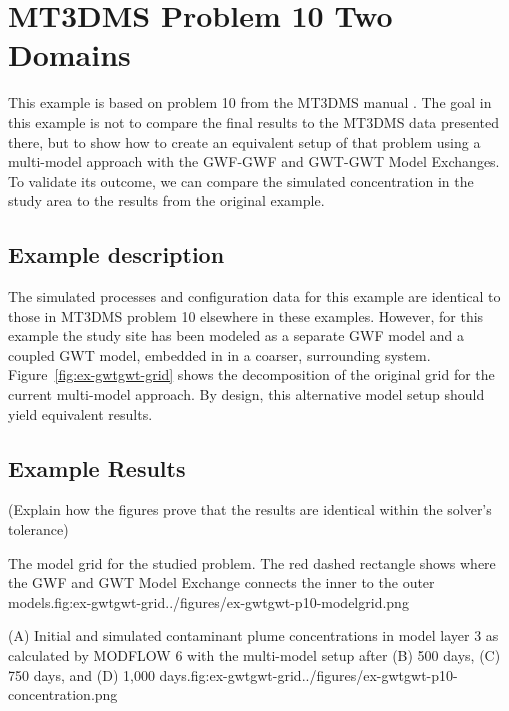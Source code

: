 \section{MT3DMS Problem 10 Two Domains}

This example is based on problem 10 from the MT3DMS manual \citep{zheng1999mt3dms}. The goal in this example is not to compare the final results to the MT3DMS data presented there, but to show how to create an equivalent setup of that problem using a multi-model approach with the GWF-GWF and GWT-GWT Model Exchanges. To validate its outcome, we can compare the simulated concentration in the study area to the \mf results from the original example.

\subsection{Example description}

The simulated processes and configuration data for this example are identical to those in \mf  MT3DMS problem 10 elsewhere in these examples. However, for this example the study site has been modeled as a separate GWF model and a coupled GWT model, embedded in in a coarser, surrounding system. Figure~\ref{fig:ex-gwtgwt-grid} shows the decomposition of the original grid for the current multi-model approach. By design, this alternative model setup should yield equivalent results.

\subsection{Example Results}

(Explain how the figures prove that the results are identical within the solver’s tolerance)

\begin{StandardFigure}{The model grid for the studied problem. The red dashed rectangle shows where the GWF and GWT Model Exchange connects the inner to the outer models.}{fig:ex-gwtgwt-grid}{../figures/ex-gwtgwt-p10-modelgrid.png}
\end{StandardFigure}

\begin{StandardFigure}{(A) Initial and simulated contaminant plume concentrations in model layer 3 as calculated by MODFLOW 6 with the multi-model setup after (B) 500 days, (C) 750 days, and (D) 1,000 days.}{fig:ex-gwtgwt-grid}{../figures/ex-gwtgwt-p10-concentration.png}
\end{StandardFigure}

